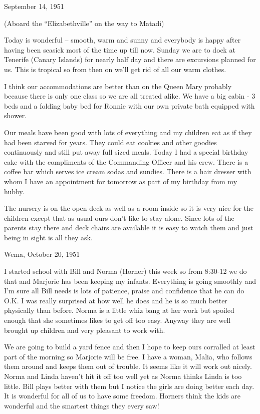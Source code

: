 \documentclass[]{book}
\begin{document}
September 14, 1951

(Aboard the ``Elizabethville'' on the way to Matadi)

Today is wonderful -- smooth, warm and sunny and everybody is happy after having been seasick most of the time up till now. Sunday we are to dock at Tenerife (Canary Islands) for nearly half day and there are excursions planned for us. This is tropical so from then on we'll get rid of all our warm clothes.

I think our accommodations are better than on the Queen Mary probably because there is only one class so we are all treated alike. We have a big cabin - 3 beds and a folding baby bed for Ronnie with our own private bath equipped with shower.

Our meals have been good with lots of everything and my children eat as if they had been starved for years. They could eat cookies and other goodies continuously and still put away full sized meals. Today I had a special birthday cake with the compliments of the Commanding Officer and his crew. There is a coffee bar which serves ice cream sodas and sundies. There is a hair dresser with whom I have an appointment for tomorrow as part of my birthday from my hubby.

The nursery is on the open deck as well as a room inside so it is very nice for the children except that as usual ours don't like to stay alone. Since lots of the parents stay there and deck chairs are available it is easy to watch them and just being in sight is all they ask.

Wema, October 20, 1951

I started school with Bill and Norma (Horner) this week so from 8:30-12 we do that and Marjorie has been keeping my infants. Everything is going smoothly and I'm sure all Bill needs is lots of patience, praise and confidence that he can do O.K. I was really surprised at how well he does and he is so much better physically than before. Norma is a little whiz bang at her work but spoiled enough that she sometimes likes to get off too easy. Anyway they are well brought up children and very pleasant to work with.

We are going to build a yard fence and then I hope to keep ours corralled at least part of the morning so Marjorie will be free. I have a woman, Malia, who follows them around and keeps them out of trouble. It seems like it will work out nicely. Norma and Linda haven't hit it off too well yet as Norma thinks Linda is too little. Bill plays better with them but I notice the girls are doing better each day. It is wonderful for all of us to have some freedom. Horners think the kids are wonderful and the smartest things they every saw!
\end{document}
